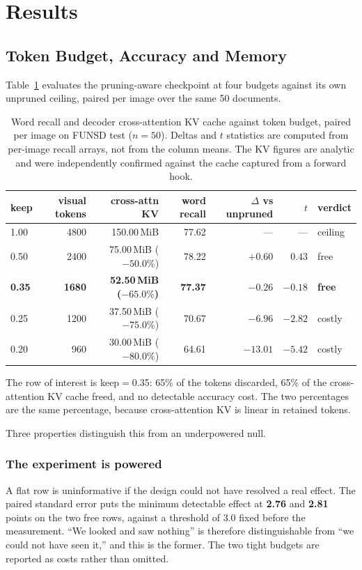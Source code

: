 \documentclass[conference]{IEEEtran}
\begin{document}
\section{Results}

\subsection{Token Budget, Accuracy and Memory}
\label{sec:budget}

Table~\ref{tab:budget} evaluates the pruning-aware checkpoint at four budgets against its own
unpruned ceiling, paired per image over the same 50 documents.

\begin{table}[htbp]
\caption{Word recall and decoder cross-attention KV cache against token budget, paired per
image on FUNSD test ($n = 50$). Deltas and $t$ statistics are computed from per-image recall
arrays, not from the column means. The KV figures are analytic and were independently
confirmed against the cache captured from a forward hook.}
\label{tab:budget}
\centering
\begin{tabular}{@{}lrrrrrl@{}}
\toprule
keep & visual tokens & cross-attn KV & word recall & $\Delta$ vs unpruned & $t$ & verdict \\
\midrule
1.00 & 4800 & 150.00\,MiB            & 77.62 & ---            & ---    & ceiling \\
0.50 & 2400 & \ \,75.00\,MiB ($-50.0\%$) & 78.22 & $+0.60$        & $0.43$ & free \\
\textbf{0.35} & \textbf{1680} & \textbf{\ \,52.50\,MiB ($\bm{-65.0\%}$)} & \textbf{77.37} & $\bm{-0.26}$ & $\bm{-0.18}$ & \textbf{free} \\
0.25 & 1200 & \ \,37.50\,MiB ($-75.0\%$) & 70.67 & $-6.96$        & $-2.82$ & costly \\
0.20 & \ \,960 & \ \,30.00\,MiB ($-80.0\%$) & 64.61 & $-13.01$       & $-5.42$ & costly \\
\bottomrule
\end{tabular}
\end{table}

The row of interest is keep$=$0.35: 65\% of the tokens discarded, 65\% of the
cross-attention KV cache freed, and no detectable accuracy cost. The two percentages are the
same percentage, because cross-attention KV is linear in retained tokens.

Three properties distinguish this from an underpowered null.

\subsubsection{The experiment is powered}
A flat row is uninformative if the design could not have resolved a real effect. The paired
standard error puts the minimum detectable effect at \textbf{2.76} and \textbf{2.81} points
on the two free rows, against a threshold of $3.0$ fixed before the measurement. ``We looked
and saw nothing'' is therefore distinguishable from ``we could not have seen it,'' and this
is the former. The two tight budgets are reported as costs rather than omitted.
\end{document}
